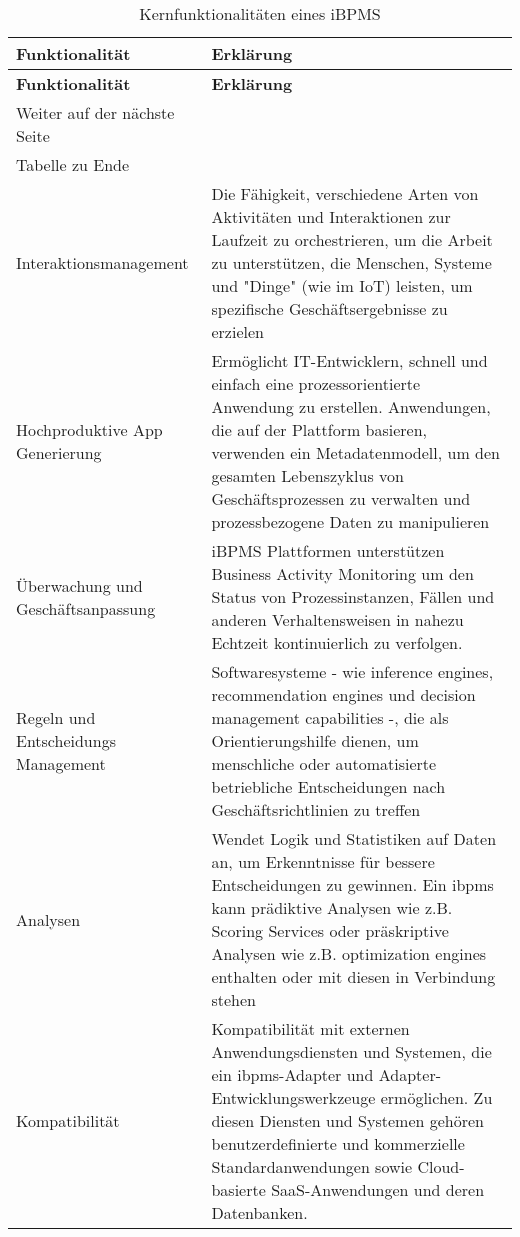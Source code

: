  \begin{longtable}{p{4.5cm}X}
  \caption{Kernfunktionalitäten eines iBPMS \cite{ibpms}}\\
  \label{table:GartnerIBPMS}
  \textbf{Funktionalität} & \textbf{Erklärung}  \\
  \hline
  \endfirsthead %
  \textbf{Funktionalität} & \textbf{Erklärung}  \\
  \hline
  \endhead %
  Weiter auf der n{\"a}chste Seite\\
  \endfoot
  \hline
  Tabelle zu Ende \\
  \endlastfoot
  Interaktionsmanagement & Die Fähigkeit, verschiedene Arten von Aktivitäten und Interaktionen zur Laufzeit zu orchestrieren, um die Arbeit zu unterstützen, die Menschen, Systeme und "Dinge" (wie im IoT) leisten, um spezifische Geschäftsergebnisse zu erzielen
  \\ \hline
  Hochproduktive App Generierung & Ermöglicht  IT-Entwicklern, schnell und einfach eine prozessorientierte Anwendung zu erstellen.
  Anwendungen, die auf der Plattform basieren, verwenden ein Metadatenmodell, um den gesamten Lebenszyklus von Geschäftsprozessen zu verwalten und prozessbezogene Daten zu manipulieren
  \\ \hline
  Überwachung und Geschäftsanpassung & iBPMS Plattformen unterstützen Business Activity Monitoring um den Status von Prozessinstanzen, Fällen und anderen Verhaltensweisen in nahezu Echtzeit kontinuierlich zu verfolgen.
  \\ \hline
  Regeln und Entscheidungs Management &  Softwaresysteme - wie inference engines, recommendation engines und decision management capabilities -, die als Orientierungshilfe dienen, um menschliche oder automatisierte betriebliche Entscheidungen nach Geschäftsrichtlinien zu treffen
  \\ \hline
  Analysen & Wendet Logik und Statistiken auf Daten an, um Erkenntnisse für bessere Entscheidungen zu gewinnen. Ein \ac{ibpms} kann prädiktive Analysen wie z.B. Scoring Services oder präskriptive Analysen wie z.B. optimization engines enthalten oder mit diesen in Verbindung stehen
  \\ \hline
  Kompatibilität &  Kompatibilität mit externen Anwendungsdiensten und Systemen, die ein \ac{ibpms}-Adapter und Adapter-Entwicklungswerkzeuge ermöglichen. Zu diesen Diensten und Systemen gehören benutzerdefinierte und kommerzielle Standardanwendungen sowie Cloud-basierte SaaS-Anwendungen und deren Datenbanken.

\end{longtable}
